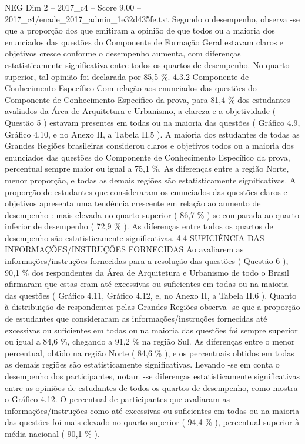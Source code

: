 \begin{textsample}{NEG Dim 2 – 2017\_c4 – Score 9.00 – 2017\_c4/enade\_2017\_admin\_1e32d435fe.txt}
Segundo o desempenho, observa -se que a proporção dos que emitiram a opinião de que todos ou a maioria dos enunciados das questões do Componente de Formação Geral estavam claros e objetivos cresce conforme o desempenho aumenta, com diferenças estatisticamente significativa entre todos os quartos de desempenho.
No quarto superior, tal opinião foi declarada por 85,5 \%. 4.3.2 Componente de Conhecimento Específico Com relação aos enunciados das questões do Componente de Conhecimento Específico da prova, para 81,4 \% dos estudantes avaliados da Área de Arquitetura e Urbanismo, a clareza e a objetividade ( Questão 5 ) estavam presentes em todas ou na maioria das questões ( Gráfico 4.9, Gráfico 4.10, e no Anexo II, a Tabela II.5 ).
A maioria dos estudantes de todas as Grandes Regiões brasileiras considerou claros e objetivos todos ou a maioria dos enunciados das questões do Componente de Conhecimento Específico da prova, percentual sempre maior ou igual a 75,1 \%.
As diferenças entre a região Norte, menor proporção, e todas as demais regiões são estatisticamente significativas.
A proporção de estudantes que consideraram os enunciados das questões claros e objetivos apresenta uma tendência crescente em relação ao aumento de desempenho : mais elevada no quarto superior ( 86,7 \% ) se comparada ao quarto inferior de desempenho ( 72,9 \% ).
As diferenças entre todos os quartos de desempenho são estatisticamente significativas. 4.4 SUFICIÊNCIA DAS INFORMAÇÕES/INSTRUÇÕES FORNECIDAS Ao avaliarem as informações/instruções fornecidas para a resolução das questões ( Questão 6 ), 90,1 \% dos respondentes da Área de Arquitetura e Urbanismo de todo o Brasil afirmaram que estas eram até excessivas ou suficientes em todas ou na maioria das questões ( Gráfico 4.11, Gráfico 4.12, e, no Anexo II, a Tabela II.6 ).
Quanto à distribuição de respondentes pelas Grandes Regiões observa -se que a proporção de estudantes que consideraram as informações/instruções fornecidas até excessivas ou suficientes em todas ou na maioria das questões foi sempre superior ou igual a 84,6 \%, chegando a 91,2 \% na região Sul.
As diferenças entre o menor percentual, obtido na região Norte ( 84,6 \% ), e os percentuais obtidos em todas as demais regiões são estatisticamente significativas.
Levando -se em conta o desempenho dos participantes, notam -se diferenças estatisticamente significativas entre as opiniões de estudantes de todos os quartos de desempenho, como mostra o Gráfico 4.12.
O percentual de participantes que avaliaram as informações/instruções como até excessivas ou suficientes em todas ou na maioria das questões foi mais elevado no quarto superior ( 94,4 \% ), percentual superior à média nacional ( 90,1 \% ).

\end{textsample}
